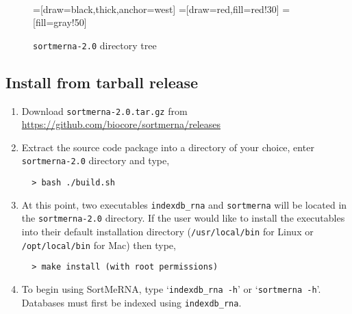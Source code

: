 \documentclass[10pt,a4paper]{article}
\begin{document}
\begin{figure}[here!]
\caption{\texttt{sortmerna-2.0} directory tree}~\\
\centering
{}=[draw=black,thick,anchor=west]
=[draw=red,fill=red!30]
=[fill=gray!50]
\label{fig:systemtree}
\end{figure}

\subsection{Install from tarball release}
\label{sec:install}

\begin{enumerate}
 \item Download \texttt{sortmerna-2.0.tar.gz} from \url{https://github.com/biocore/sortmerna/releases}
 \item Extract the source code package into a directory of your choice, enter \texttt{sortmerna-2.0} directory and type,
  \begin{verbatim}
  > bash ./build.sh
 \end{verbatim}
  \item At this point, two executables \texttt{indexdb\_rna} and \texttt{sortmerna} will be located
 in the \texttt{sortmerna-2.0} directory. 
 If the user would like to install the executables into their default installation directory (\texttt{/usr/local/bin} for Linux or \texttt{/opt/local/bin} for Mac) then type,
 \begin{verbatim}
  > make install (with root permissions)
 \end{verbatim}
 \item To begin using SortMeRNA, type `\texttt{indexdb\_rna -h}' or `\texttt{sortmerna -h}'. Databases must first be indexed using \texttt{indexdb\_rna}.
\end{enumerate}
\end{document}
